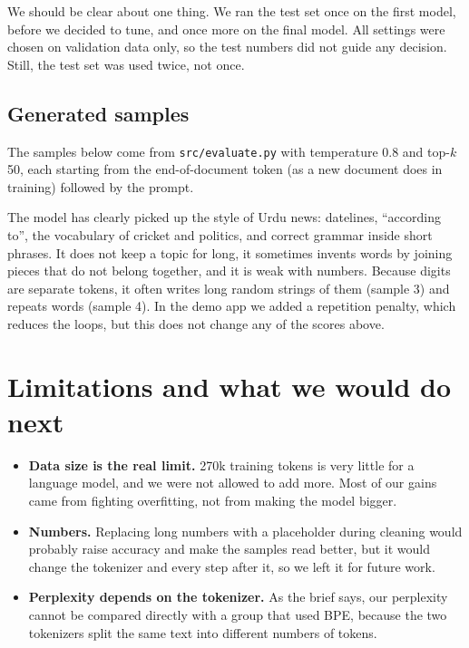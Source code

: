 \documentclass[11pt,a4paper]{article}
\begin{document}
We should be clear about one thing. We ran the test set once on the first model, before we decided to tune, and once more on the final model. All settings were chosen on validation data only, so the test numbers did not guide any decision. Still, the test set was used twice, not once.

\subsection*{Generated samples}

The samples below come from \texttt{src/evaluate.py} with temperature 0.8 and top-$k$ 50, each starting from the end-of-document token (as a new document does in training) followed by the prompt.


The model has clearly picked up the style of Urdu news: datelines, ``according to'', the vocabulary of cricket and politics, and correct grammar inside short phrases. It does not keep a topic for long, it sometimes invents words by joining pieces that do not belong together, and it is weak with numbers. Because digits are separate tokens, it often writes long random strings of them (sample 3) and repeats words (sample 4). In the demo app we added a repetition penalty, which reduces the loops, but this does not change any of the scores above.

\section{Limitations and what we would do next}

\begin{itemize}
\item \textbf{Data size is the real limit.} 270k training tokens is very little for a language model, and we were not allowed to add more. Most of our gains came from fighting overfitting, not from making the model bigger.
\item \textbf{Numbers.} Replacing long numbers with a placeholder during cleaning would probably raise accuracy and make the samples read better, but it would change the tokenizer and every step after it, so we left it for future work.
\item \textbf{Perplexity depends on the tokenizer.} As the brief says, our perplexity cannot be compared directly with a group that used BPE, because the two tokenizers split the same text into different numbers of tokens.
\end{itemize}
\end{document}
